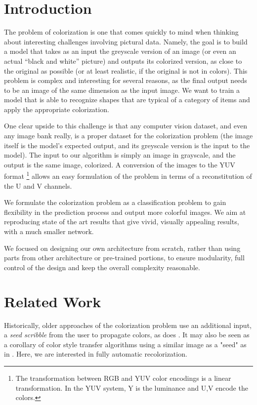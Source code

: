 \documentclass[10pt,twocolumn,letterpaper]{article}
\begin{document}
\section*{Introduction}

The problem of colorization is one that comes quickly to mind when thinking about interesting challenges involving pictural data. Namely, the goal is to build a model that takes as an input the greyscale version of an image (or even an actual ``black and white'' picture) and outputs its colorized version, as close to the original as possible (or at least realistic, if the original is not in colors). This problem is complex and interesting for several reasons, as the final output needs to be an image of the same dimension as the input image. We want to train a model that is able to recognize shapes that are typical of a category of items and apply the appropriate colorization.

One clear upside to this challenge is that any computer vision dataset, and even any image bank really, is a proper dataset for the colorization problem (the image itself is the model's expected output, and its greyscale version is the input to the model).
The input to our algorithm is simply an image in grayscale, and the output is the same image, colorized. A conversion of the images to the YUV format \footnote{The transformation between RGB and YUV color encodings is a linear transformation. In the YUV system, Y is the luminance and U,V encode the colors.} allows an easy formulation of the problem in terms of a reconstitution of the U and V channels.

We formulate the colorization problem as a classification problem to gain flexibility in the prediction process and output more colorful images. We aim at reproducing state of the art results that give vivid, visually appealing results, with a much smaller network.

We focused on designing our own architecture from scratch, rather than using parts from other architecture or pre-trained portions, to ensure modularity, full control of the design and keep the overall complexity reasonable. 

\section{Related Work} \label{relatedwork}

Historically, older approaches of the colorization problem use an additional input, a \textit{seed scribble} from the user to propagate colors, as does \cite{levin2004colorization}. It may also be seen as a corollary of color style transfer algorithms using a similar image as a "seed" as in \cite{he2017neuralct}. Here, we are interested in fully automatic recolorization.
\end{document}
